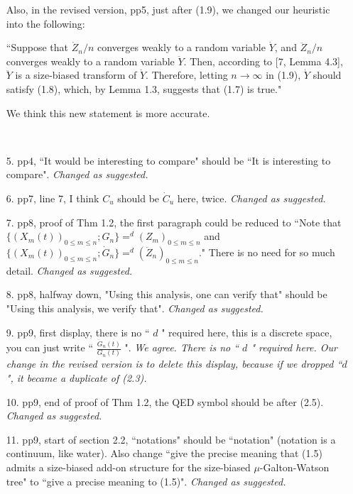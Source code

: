 \documentclass[12pt,a4paper]{amsart}
\numberwithin{equation}{section}
\begin{document}
\begin{itemize}
{	
	Also, in the revised version, pp5, just after (1.9), we changed our heuristic into the following:

	``Suppose that $\dot Z_n/n$ converges weakly to a random variable $\dot Y$, and $\ddot Z_n/n$ converges weakly to a random variable $\ddot Y$. 
	Then, according to [7, Lemma 4.3], $\ddot Y$ is a size-biased transform of $\dot Y$. 
	Therefore, letting $n\to\infty$ in (1.9), 
	$\dot Y$ should satisfy (1.8), which, by Lemma 1.3, suggests that (1.7) is true."
	
	We think this new statement is more accurate.}
\\
\item[5.] 
	pp4, ``It would be interesting to compare" should be ``It is interesting to compare". 
	{\it Changed as suggested.}
\\
\item[6.] 
	pp7, line 7, I think $C_u$ should be $\dot C_u$ here, twice. 
	{\it Changed as suggested.}
\\
\item[7.]
	pp8, proof of Thm 1.2, the first paragraph could be reduced to ``Note that $\{(X_m(t))_{0 \leq m \leq n}; G_n\} =^d (Z_m)_{0 \leq m \leq n}$ and $\{(X_m(t))_{0\leq m \leq n}; \dot G_n\} =^d (\ddot Z_n)_{0 \leq m \leq n}$." There is no need for so much detail.
	{\it Changed as suggested.}
\\	
\item[8.] 
	pp8, halfway down, "Using this analysis, one can verify that" should be "Using this analysis, we verify that". 
	{\it Changed as suggested.}
\\
\item[9.] 
	pp9, first display, there is no `` $d$ " required here, this is a discrete space, you can just write `` $\frac{\ddot G_n(t)}{G_n(t)}$ ". 
	{\it We agree. 
		There is no `` $d$ " required here. 
		Our change in the revised version is to delete this display, because if we dropped
		``$d$", it became a duplicate of (2.3).}
\\
\item[10.] 
	pp9, end of proof of Thm 1.2, the QED symbol should be after (2.5). 
	{\it Changed as suggested.}
\\
\item[11.] 
	pp9, start of section 2.2, ``notations" should be ``notation" (notation is a continuum, like water). Also change ``give the precise meaning that (1.5) admits a size-biased add-on structure for the size-biased $\mu$-Galton-Watson tree" to ``give a precise meaning to (1.5)". 
	{\it Changed as suggested.}

\end{itemize}
\end{document}
